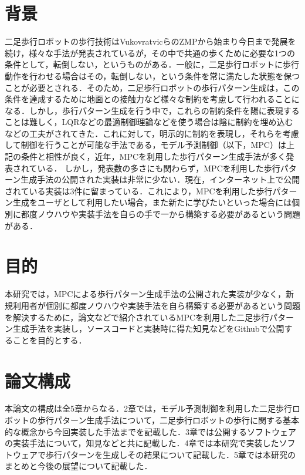 
\section{背景}
二足歩行ロボットの歩行技術はVukovratvicらのZMP\cite{VUKOBRATOVIC19721}から始まり今日まで発展を続け，様々な手法が発表されているが，その中で共通の歩くために必要な1つの条件として，転倒しない，というものがある．一般に，二足歩行ロボットに歩行動作を行わせる場合はその，転倒しない，という条件を常に満たした状態を保つことが必要とされる．そのため，二足歩行ロボットの歩行パターン生成は，この条件を達成するために地面との接触力など様々な制約を考慮して行われることになる．しかし，歩行パターン生成を行う中で，これらの制約条件を陽に表現することは難しく，LQRなどの最適制御理論などを使う場合は陰に制約を埋め込むなどの工夫がされてきた．これに対して，明示的に制約を表現し，それらを考慮して制御を行うことが可能な手法である，モデル予測制御（以下，MPC）\cite{MPC}は上記の条件と相性が良く，近年，MPCを利用した歩行パターン生成手法が多く発表されている．
しかし，発表数の多さにも関わらず，MPCを利用した歩行パターン生成手法の公開された実装は非常に少ない．現在，インターネット上で公開されている実装は3件\cite{GITHUB1}\cite{GITHUB2}\cite{GITHUB3}に留まっている．これにより，MPCを利用した歩行パターン生成をユーザとして利用したい場合，また新たに学びたいといった場合には個別に都度ノウハウや実装手法を自らの手で一から構築する必要があるという問題がある．

\section{目的}
本研究では，MPCによる歩行パターン生成手法の公開された実装が少なく，新規利用者が個別に都度ノウハウや実装手法を自ら構築する必要があるという問題を解決するために，論文などで紹介されているMPCを利用した二足歩行パターン生成手法を実装し，ソースコードと実装時に得た知見などをGithub\cite{MYGITHUB}で公開することを目的とする．

\section{論文構成}
本論文の構成は全5章からなる．2章では，モデル予測制御を利用した二足歩行ロボットの歩行パターン生成手法について，二足歩行ロボットの歩行に関する基本的な概念から今回実装した手法までを記載した．3章では公開するソフトウェアの実装手法について，知見などと共に記載した．4章では本研究で実装したソフトウェアで歩行パターンを生成しその結果について記載した．5章では本研究のまとめと今後の展望について記載した．


\newpage
